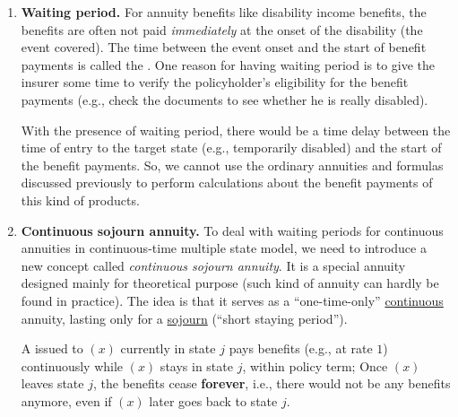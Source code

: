 \begin{enumerate}
\begin{itemize}
\begin{itemize}
\item \emph{(discrete, due)} \(\ax**{\endowxn}[\blc{i}\mgc{k}]
\overset{(m\le n)}{=}\ax**{x:\angl{m}}[\blc{i}\mgc{k}]+\sum_{j}^{}v^{m}\px[m]{x}[\blc{i}j]\ax**{x+m}[j\mgc{k}]
\overset{(m=1)}{=}\delta_{\blc{i}\mgc{k}}+\sum_{j}^{}v\px[]{x}[\blc{i}j]\ax**{x+1:\angl{n-1}}[j\mgc{k}]\).
\item \emph{(continuous)} \(
\ax*{\endowxn}[\blc{i}\mgc{k}]
\overset{(m\le n)}{=}\ax*{x:\angl{m}}[\blc{i}\mgc{k}]
+\sum_{j}^{}v^{m}\px[m]{x}[\blc{i}j]\ax*{x+m:\angl{n-m}}[j\mgc{k}]
\).
\end{itemize}
\end{itemize}
\item \textbf{Waiting period.} For annuity benefits like disability income
benefits, the benefits are often not paid \emph{immediately} at the onset of
the disability (the event covered). The time between the event onset and the
start of benefit payments is called the . One reason for
having waiting period is to give the insurer some time to verify the
policyholder's eligibility for the benefit payments (e.g., check
 the documents to see whether he is really disabled).

With the presence of waiting period, there would be a time delay between the
time of entry to the target state (e.g., temporarily disabled) and the start of
the benefit payments. So, we cannot use the ordinary annuities and formulas
discussed previously to perform calculations about the benefit payments of this
kind of products.

\item \textbf{Continuous sojourn annuity.} To deal with waiting periods for
continuous annuities in continuous-time multiple state model, we need to
introduce a new concept called \emph{continuous sojourn annuity}. It is a
special annuity designed mainly for theoretical purpose (such kind of annuity
can hardly be found in practice). The idea is that it serves as a
``one-time-only'' \underline{continuous} annuity, lasting only for a
\underline{sojourn} (``short staying period'').

A  issued to \((x)\) currently in state \(j\)
pays benefits (e.g., at rate \(1\)) continuously while \((x)\) stays in state
\(j\), within policy term; Once \((x)\) leaves state \(j\), the benefits cease
\textbf{forever}, i.e., there would not be any benefits anymore, even if
\((x)\) later goes back to state \(j\).


\end{enumerate}
